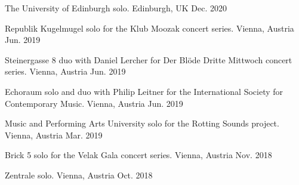 

\begin{cvhonors}

  \cvhonor
    {The University of Edinburgh} %
    {solo.} %
    {Edinburgh, UK} %
    {Dec. 2020} %

  \cvhonor
    {Republik Kugelmugel} 
    {solo for the Klub Moozak concert series.} 
    {Vienna, Austria} 
    {Jun. 2019} %

  \cvhonor
    {Steinergasse 8} 
    {duo with Daniel Lercher for Der Bl\"{o}de Dritte Mittwoch concert series.} 
    {Vienna, Austria} 
    {Jun. 2019} %

  \cvhonor
    {Echoraum} 
    {solo and duo with Philip Leitner for the International Society for Contemporary Music.} 
    {Vienna, Austria} 
    {Jun. 2019} %

  \cvhonor
    {Music and Performing Arts University} 
    {solo for the Rotting Sounds project.} 
    {Vienna, Austria} 
    {Mar. 2019} %

  \cvhonor
    {Brick 5}
    {solo for the Velak Gala concert series.}  
    {Vienna, Austria} 
    {Nov. 2018} %

  \cvhonor
    {Zentrale}
    {solo.}
    {Vienna, Austria} 
    {Oct. 2018} %


\end{cvhonors}
